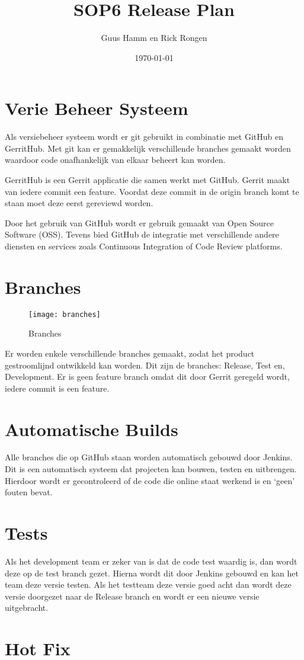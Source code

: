 \documentclass{scrreprt}
\title{SOP6 Release Plan}
\author{Guus Hamm en Rick Rongen}
\date{\today}
\begin{document}
	\maketitle
	\tableofcontents
	\newpage
	\chapter{Verie Beheer Systeem}
	Als versiebeheer systeem wordt er git gebruikt in combinatie met GitHub en GerritHub. Met git kan er gemakkelijk verschillende branches gemaakt worden waardoor code onafhankelijk van elkaar beheert kan worden.
	
	GerritHub is een Gerrit applicatie die samen werkt met GitHub. Gerrit maakt van iedere commit een feature. Voordat deze commit in de origin branch komt te staan moet deze eerst gereviewd worden. 
	
	Door het gebruik van GitHub wordt er gebruik gemaakt van Open Source Software (OSS). Tevens bied GitHub de integratie met verschillende andere diensten en services zoals Continuous Integration of Code Review platforms.
	\chapter{Branches}
	\begin{figure}
		\centering
		\texttt{[image: branches]}
		\caption{Branches}
		\label{img:branches}
	\end{figure}
	Er worden enkele verschillende branches gemaakt, zodat het product gestroomlijnd ontwikkeld kan worden. Dit zijn de branches: Release, Test en, Development. Er is geen feature branch omdat dit door Gerrit geregeld wordt, iedere commit is een feature.
	\chapter{Automatische Builds}
	Alle branches die op GitHub staan worden automatisch gebouwd door Jenkins. Dit is een automatisch systeem dat projecten kan bouwen, testen en uitbrengen. Hierdoor wordt er gecontroleerd of de code die online staat werkend is en ‘geen’ fouten bevat.
	\chapter{Tests}
	Als het development team er zeker van is dat de code test waardig is, dan wordt deze op de test branch gezet. Hierna wordt dit door Jenkins gebouwd en kan het team deze versie testen. Als het testteam deze versie goed acht dan wordt deze versie doorgezet naar de Release branch en wordt er een nieuwe versie uitgebracht.
	\chapter{Hot Fix}
\end{document}
